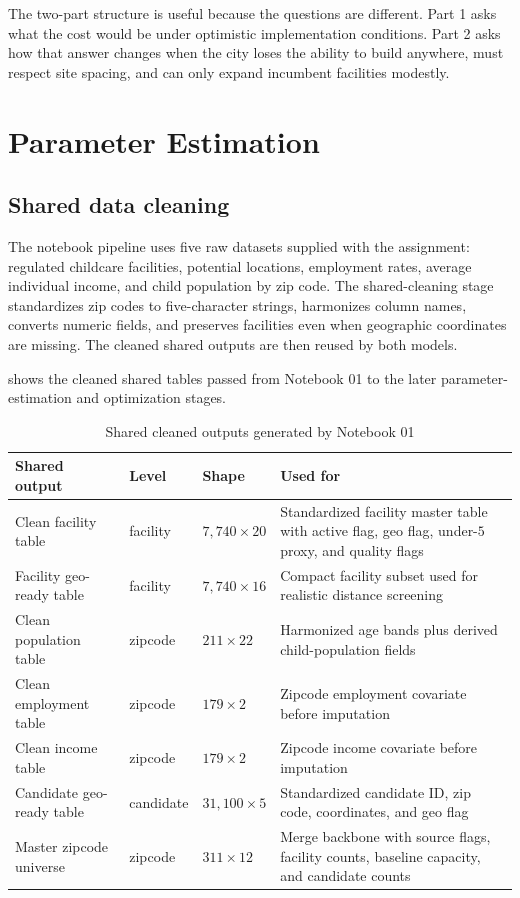 \documentclass[11pt]{article}
\begin{document}
The two-part structure is useful because the questions are different. Part 1 asks what the cost would be under optimistic implementation conditions. Part 2 asks how that answer changes when the city loses the ability to build anywhere, must respect site spacing, and can only expand incumbent facilities modestly.

\section{Parameter Estimation}

\subsection{Shared data cleaning}

The notebook pipeline uses five raw datasets supplied with the assignment: regulated childcare facilities, potential locations, employment rates, average individual income, and child population by zip code. The shared-cleaning stage standardizes zip codes to five-character strings, harmonizes column names, converts numeric fields, and preserves facilities even when geographic coordinates are missing. The cleaned shared outputs are then reused by both models.

 shows the cleaned shared tables passed from Notebook 01 to the later parameter-estimation and optimization stages.

\begin{table}[H]
\centering
\footnotesize
\renewcommand{\arraystretch}{1.08}
\begin{tabularx}{\textwidth}{L{3.6cm}L{1.6cm}L{2.0cm}Y}
\toprule
\textbf{Shared output} & \textbf{Level} & \textbf{Shape} & \textbf{Used for} \\
\midrule
Clean facility table & facility & \(7{,}740 \times 20\) & Standardized facility master table with active flag, geo flag, under-\(5\) proxy, and quality flags \\
Facility geo-ready table & facility & \(7{,}740 \times 16\) & Compact facility subset used for realistic distance screening \\
Clean population table & zipcode & \(211 \times 22\) & Harmonized age bands plus derived child-population fields \\
Clean employment table & zipcode & \(179 \times 2\) & Zipcode employment covariate before imputation \\
Clean income table & zipcode & \(179 \times 2\) & Zipcode income covariate before imputation \\
Candidate geo-ready table & candidate & \(31{,}100 \times 5\) & Standardized candidate ID, zip code, coordinates, and geo flag \\
Master zipcode universe & zipcode & \(311 \times 12\) & Merge backbone with source flags, facility counts, baseline capacity, and candidate counts \\
\bottomrule
\end{tabularx}
\caption{Shared cleaned outputs generated by Notebook 01}
\label{tab:shared-clean-structure}
\end{table}
\end{document}
